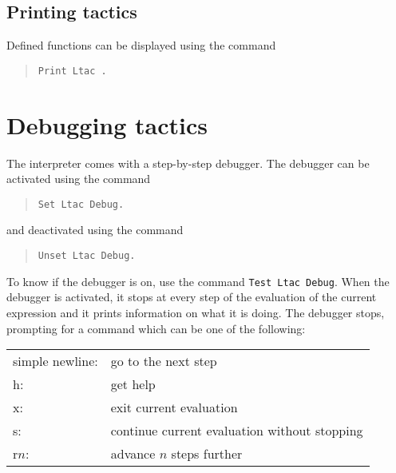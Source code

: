 

\subsection[Printing {\ltac} tactics]{Printing {\ltac} tactics}

Defined {\ltac} functions can be displayed using the command

\begin{quote}
{\tt Print Ltac {\qualid}.}
\end{quote}

\section[Debugging {\ltac} tactics]{Debugging {\ltac} tactics
}

The {\ltac} interpreter comes with a step-by-step debugger. The
debugger can be activated using the command

\begin{quote}
{\tt Set Ltac Debug.}
\end{quote}

\noindent and deactivated using the command

\begin{quote}
{\tt Unset Ltac Debug.}
\end{quote}

To know if the debugger is on, use the command \texttt{Test Ltac Debug}.
When the debugger is activated, it stops at every step of the
evaluation of the current {\ltac} expression and it prints information
on what it is doing. The debugger stops, prompting for a command which
can be one of the following:

\medskip
\begin{tabular}{ll}
simple newline: & go to the next step\\
h: & get help\\
x: & exit current evaluation\\
s: & continue current evaluation without stopping\\
r$n$: & advance $n$ steps further\\
\end{tabular}
\endinput

